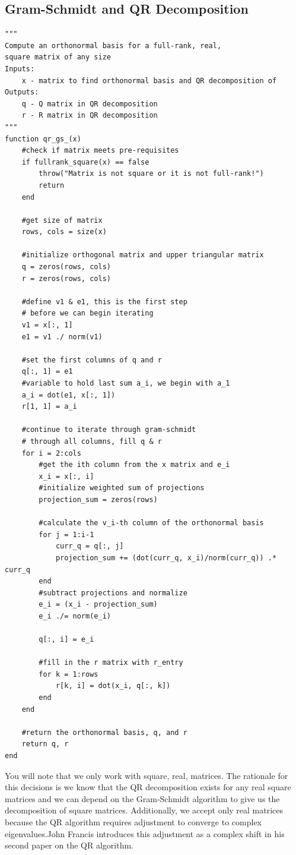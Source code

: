 \documentclass[onecolumn]{webofc}
\begin{document}
\subsection{Gram-Schmidt and QR Decomposition}
\begin{lstlisting}
"""
Compute an orthonormal basis for a full-rank, real, 
square matrix of any size
Inputs:
    x - matrix to find orthonormal basis and QR decomposition of
Outputs:
    q - Q matrix in QR decomposition
    r - R matrix in QR decomposition
"""
function qr_gs_(x)
    #check if matrix meets pre-requisites
    if fullrank_square(x) == false
        throw("Matrix is not square or it is not full-rank!")
        return
    end

    #get size of matrix
    rows, cols = size(x)

    #initialize orthogonal matrix and upper triangular matrix
    q = zeros(rows, cols)
    r = zeros(rows, cols)

    #define v1 & e1, this is the first step 
    # before we can begin iterating
    v1 = x[:, 1]
    e1 = v1 ./ norm(v1)

    #set the first columns of q and r
    q[:, 1] = e1
    #variable to hold last sum a_i, we begin with a_1
    a_i = dot(e1, x[:, 1]) 
    r[1, 1] = a_i

    #continue to iterate through gram-schmidt 
    # through all columns, fill q & r
    for i = 2:cols
        #get the ith column from the x matrix and e_i
        x_i = x[:, i]
        #initialize weighted sum of projections
        projection_sum = zeros(rows)

        #calculate the v_i-th column of the orthonormal basis
        for j = 1:i-1
            curr_q = q[:, j]
            projection_sum += (dot(curr_q, x_i)/norm(curr_q)) .* curr_q
        end
        #subtract projections and normalize
        e_i = (x_i - projection_sum)
        e_i ./= norm(e_i)

        q[:, i] = e_i

        #fill in the r matrix with r_entry
        for k = 1:rows
            r[k, i] = dot(x_i, q[:, k])
        end
    end

    #return the orthonormal basis, q, and r
    return q, r
end
\end{lstlisting}
You will note that we only work with square, real, matrices. The rationale for this decisions is we know that the QR decomposition exists for any real square matrices and we can depend on the Gram-Schmidt algorithm to give us the decomposition of square matrices. Additionally, we accept only real matrices because the QR algorithm requires adjustment to converge to complex eigenvalues.John Francis introduces this adjustment as a complex shift in his second paper on the QR algorithm\cite{RefE}.
\end{document}
